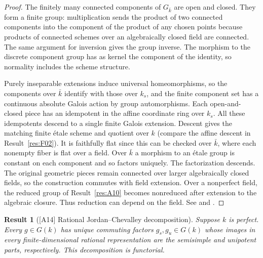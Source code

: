 \documentclass[11pt,a4paper,openany,oneside]{book}
\theoremstyle{resultstyle}
\newtheorem{statement}{Result}[chapter]
\newenvironment{result}[2]{\clubpenalty=10000\begin{statement}[\textnormal{[#1]} #2]\leavevmode\label{res:#1}\ignorespaces}{\end{statement}}
\theoremstyle{definition}
\numberwithin{equation}{chapter}
\begin{document}
\begin{proof}
The finitely many connected components of \(G_{\bar k}\) are open and
closed. They form a finite group: multiplication sends the product
of two connected components into the component of the product of
any chosen points because products of connected schemes over an
algebraically closed field are connected. The same argument for
inversion gives the group inverse. The morphism to the discrete
component group has as kernel the component of the identity, so
normality includes the scheme structure.

Purely inseparable extensions induce universal homeomorphisms, so the
components over \(\bar k\) identify with those over \(k_s\), and
the finite component set has a continuous absolute Galois action by
group automorphisms. Each open-and-closed piece has an idempotent
in the affine coordinate ring over \(k_s\). All these idempotents descend
to a single finite Galois extension. Descent gives the matching finite
étale scheme and quotient over \(k\) (compare the affine descent in
Result~\ref{res:F02}). It is faithfully flat since this can be checked
over \(\bar k\), where each nonempty fiber is flat over a field.
Over \(\bar k\) a morphism to an étale group is constant on each
component and so factors uniquely. The factorization descends.
The original geometric pieces remain connected over larger
algebraically closed fields, so the construction commutes with
field extension. Over a nonperfect field, the reduced group of
Result~\ref{res:A10} becomes nonreduced after extension to
the algebraic closure. Thus reduction can depend on the field.
See \cite[Propositions 1.29--1.39, 1.52, 2.37 and Definition 2.38]{milne}
and \cite[p.~51 correction]{milneerrata}.
\end{proof}

\begin{result}{A14}{Rational Jordan--Chevalley decomposition}
Suppose \(k\) is perfect. Every \(g\in G(k)\) has unique commuting
factors \(g_s,g_u\in G(k)\) whose images in every finite-dimensional
rational representation are the semisimple and unipotent parts,
respectively. This decomposition is functorial.
\end{result}
\end{document}
